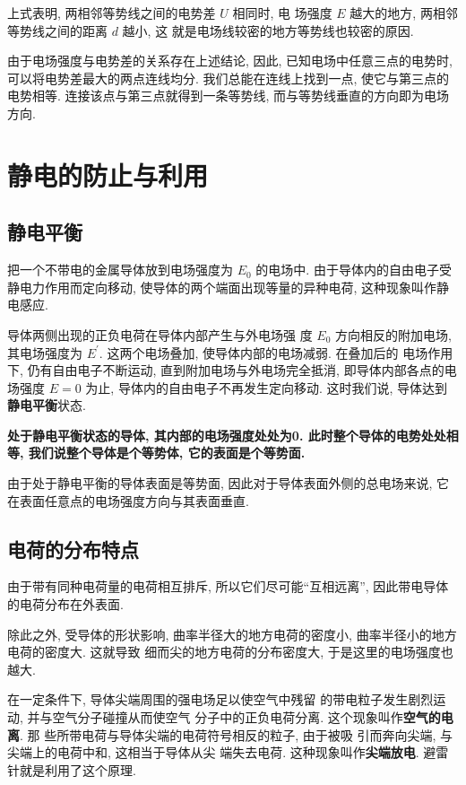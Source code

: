 \documentclass[11pt,a4paper]{ctexbook}
\begin{document}
上式表明, 两相邻等势线之间的电势差 $U$ 相同时, 电
场强度 $E$ 越大的地方, 两相邻等势线之间的距离 $d$ 越小, 这
就是电场线较密的地方等势线也较密的原因.

由于电场强度与电势差的关系存在上述结论, 因此, 已知电场中任意三点的电势时, 可以将电势差最大的两点连线均分.
我们总能在连线上找到一点, 使它与第三点的电势相等. 连接该点与第三点就得到一条等势线, 而与等势线垂直的方向即为电场方向.

\section{静电的防止与利用}
\subsection{静电平衡}

把一个不带电的金属导体放到电场强度为 $E_0$ 的电场中.
由于导体内的自由电子受静电力作用而定向移动, 使导体的两个端面出现等量的异种电荷,
这种现象叫作静电感应.

导体两侧出现的正负电荷在导体内部产生与外电场强
度 $E_0$ 方向相反的附加电场, 其电场强度为 $E^{\prime}$.
这两个电场叠加, 使导体内部的电场减弱. 在叠加后的
电场作用下, 仍有自由电子不断运动, 直到附加电场与外电场完全抵消,
即导体内部各点的电场强度 $E = 0$ 为止,
导体内的自由电子不再发生定向移动. 这时我们说, 导体达到\textbf{静电平衡}状态.

\textbf{处于静电平衡状态的导体, 其内部的电场强度处处为0. 此时整个导体的电势处处相等,
    我们说整个导体是个等势体, 它的表面是个等势面.}

由于处于静电平衡的导体表面是等势面, 因此对于导体表面外侧的总电场来说, 它在表面任意点的电场强度方向与其表面垂直.

\subsection{电荷的分布特点}

由于带有同种电荷量的电荷相互排斥, 所以它们尽可能``互相远离'', 因此带电导体的电荷分布在外表面.

除此之外, 受导体的形状影响, 曲率半径大的地方电荷的密度小, 曲率半径小的地方电荷的密度大. 这就导致
细而尖的地方电荷的分布密度大, 于是这里的电场强度也越大.

在一定条件下, 导体尖端周围的强电场足以使空气中残留
的带电粒子发生剧烈运动, 并与空气分子碰撞从而使空气
分子中的正负电荷分离. 这个现象叫作\textbf{空气的电离}. 那
些所带电荷与导体尖端的电荷符号相反的粒子, 由于被吸
引而奔向尖端, 与尖端上的电荷中和, 这相当于导体从尖
端失去电荷. 这种现象叫作\textbf{尖端放电}. 避雷针就是利用了这个原理.
\end{document}
